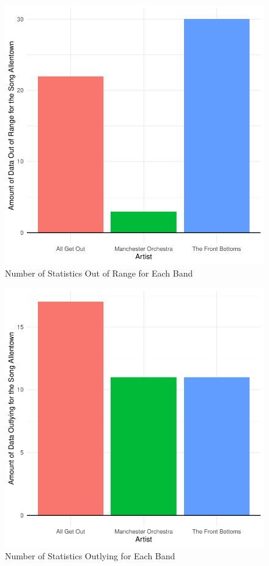 \documentclass{article}\usepackage[]{graphicx}\usepackage[]{xcolor}
\makeatletter
\def\maxwidth{ %
  \ifdim\Gin@nat@width>\linewidth
    \linewidth
  \else
    \Gin@nat@width
  \fi
}
\newenvironment{knitrout}{}{} %
\makeatother
\begin{document}
\begin{figure}[ht]
\begin{center}
\begin{knitrout}
\color{fgcolor}
\includegraphics[width=\maxwidth]{figure/unnamed-chunk-2-1} 
\end{knitrout}
\caption{Number of Statistics Out of Range for Each Band}
\label{Figure 2}
\end{center}
\end{figure}
\begin{figure}[ht]
\begin{center}
\begin{knitrout}
\color{fgcolor}
\includegraphics[width=\maxwidth]{figure/unnamed-chunk-3-1} 
\end{knitrout}
\caption{Number of Statistics Outlying for Each Band}
\label{Figure 3}
\end{center}
\end{figure}
\end{document}
